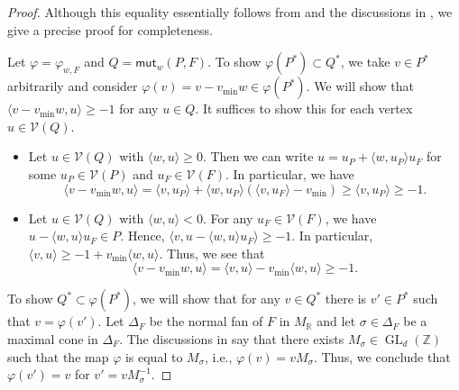 \documentclass[11pt]{article}
\numberwithin{equation}{section}
\numberwithin{equation}{section}
\numberwithin{figure}{section}
\numberwithin{table}{section}
\newcommand{\ZZ}{\mathbb{Z}}
\newcommand{\RR}{\mathbb{R}}
\newcommand{\calV}{\mathcal{V}}
\newcommand{\GL}{\operatorname{GL}}
\newcommand{\mut}{\mathsf{mut}}
\begin{document}
\begin{proof}
Although this equality essentially follows from \cite[Proposition~4]{ACGK} and the discussions in \cite[p.~12]{ACGK}, we give a precise proof for completeness.

Let $\varphi=\varphi_{w,F}$ and $Q=\mut_w(P,F)$.
To show $\varphi(P^*)\subset Q^*$, we take $v \in P^*$ arbitrarily and consider $\varphi(v)=v - v_{\min}w \in \varphi(P^*)$.
We will show that $\langle v - v_{\min}w,u \rangle \geq -1$ for any $u \in Q$.
It suffices to show this for each vertex $u\in\calV(Q)$.
\begin{itemize}\itemsep=0pt
\item Let $u\in\calV(Q)$ with $\langle w,u \rangle \geq 0$. Then we can write $u=u_P+\langle w,u_P \rangle u_F$ for some $u_P \in \calV(P)$ and $u_F \in \calV(F)$.
In particular, we have
\begin{displaymath}
\langle v-v_{\min}w, u\rangle = \langle v,u_P \rangle + \langle w,u_P \rangle(\langle v,u_F \rangle-v_{\min}) \geq \langle v,u_P \rangle \geq -1.
\end{displaymath}

\item Let $u\in\calV(Q)$ with $\langle w,u \rangle < 0$. For any $u_F \in \calV(F)$, we have $u-\langle w,u \rangle u_F \in P$.
Hence, $\langle v,u-\langle w,u \rangle u_F \rangle \geq -1$. In particular, $\langle v,u \rangle \geq -1 + v_{\min} \langle w,u \rangle$. Thus, we see that
\begin{displaymath}
\langle v-v_{\min}w, u\rangle =\langle v, u\rangle - v_{\min} \langle w, u\rangle \geq -1.
\end{displaymath}
\end{itemize}

To show $Q^*\subset\varphi(P^*)$, we will show that for any $v \in Q^*$ there is $v' \in P^*$ such that $v=\varphi(v')$.
Let $\Delta_F$ be the normal fan of $F$ in $M_\RR$ and let $\sigma \in \Delta_F$ be a maximal cone in $\Delta_F$.
The discussions in \cite[p.~12]{ACGK} say that there exists $M_\sigma \in \GL_d(\ZZ)$ such that the map $\varphi$ is equal to $M_\sigma$,
i.e., $\varphi(v)=vM_\sigma$. Thus, we conclude that $\varphi(v')=v$ for $v'=vM_\sigma^{-1}$.
\end{proof}
\end{document}
